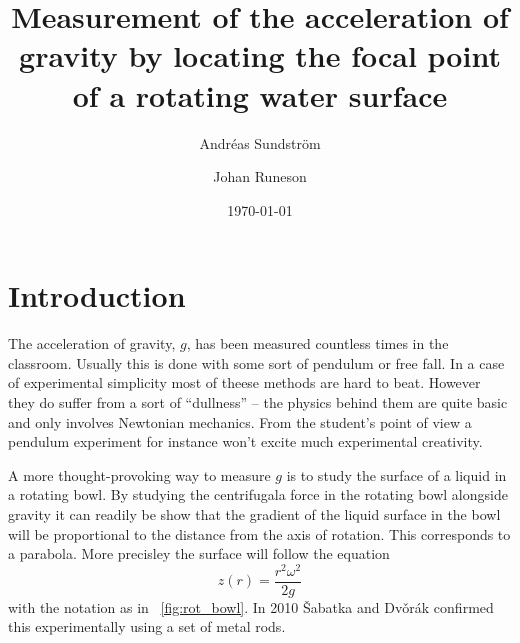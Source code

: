 \documentclass[11pt,towcolumn, swedish, english]{article}
\newcommand{\figref}{\figurename~\ref}
\begin{document}
\title{Measurement of the acceleration of gravity by locating the focal point of a
  rotating water surface}

\author{Andréas Sundström \footnotemark \and Johan Runeson\footnotemark[1]}
\date{\today}




\section{Introduction}
The acceleration of gravity, $g$, has been measured countless times in the
classroom. Usually this is done with some sort of pendulum or free fall. In a
case of experimental simplicity most of theese methods are hard to beat. However
they do suffer from a sort of ``dullness'' -- the physics behind them are quite
basic and only involves Newtonian mechanics. From the student's point of view a
pendulum experiment for instance won't excite much experimental creativity. 

A more thought-provoking way to measure $g$ is to study the surface of a liquid
in a rotating bowl. By studying the centrifugala force in the rotating bowl
alongside gravity it can readily be show that the gradient of the liquid surface in
the bowl will be proportional to the distance from the axis of rotation. This
corresponds to a parabola. More precisley the surface will follow the
equation\cite{Sabatka2010, Berg1990} 
\begin{equation}\label{eq:parabola}
z(r)=\frac{r^2\omega^2}{2g}
\end{equation}
with the notation as in \figref{fig:rot_bowl}. In 2010 \v{S}abatka and
Dv\v{o}rák\cite{Sabatka2010} confirmed this experimentally using a set of metal
rods. 
\end{document}
